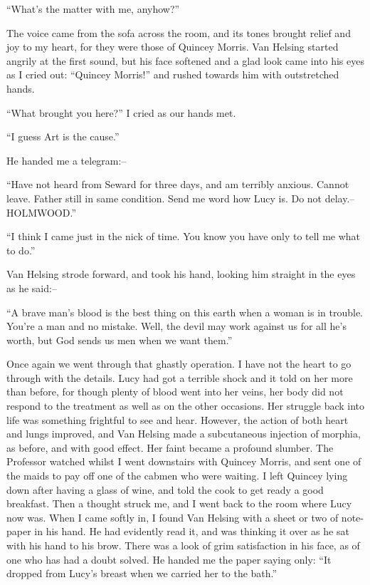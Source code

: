 \documentclass[12pt,openright]{book}
\begin{document}
“What’s the matter with me, anyhow?”

The voice came from the sofa across the room, and its tones brought relief and joy to my heart, for they were those of Quincey Morris. Van Helsing started angrily at the first sound, but his face softened and a glad look came into his eyes as I cried out: “Quincey Morris!” and rushed towards him with outstretched hands.

“What brought you here?” I cried as our hands met.

“I guess Art is the cause.”

He handed me a telegram:–

“Have not heard from Seward for three days, and am terribly anxious. Cannot leave. Father still in same condition. Send me word how Lucy is. Do not delay.–HOLMWOOD.”

“I think I came just in the nick of time. You know you have only to tell me what to do.”

Van Helsing strode forward, and took his hand, looking him straight in the eyes as he said:–

“A brave man’s blood is the best thing on this earth when a woman is in trouble. You’re a man and no mistake. Well, the devil may work against us for all he’s worth, but God sends us men when we want them.”

Once again we went through that ghastly operation. I have not the heart to go through with the details. Lucy had got a terrible shock and it told on her more than before, for though plenty of blood went into her veins, her body did not respond to the treatment as well as on the other occasions. Her struggle back into life was something frightful to see and hear. However, the action of both heart and lungs improved, and Van Helsing made a subcutaneous injection of morphia, as before, and with good effect. Her faint became a profound slumber. The Professor watched whilst I went downstairs with Quincey Morris, and sent one of the maids to pay off one of the cabmen who were waiting. I left Quincey lying down after having a glass of wine, and told the cook to get ready a good breakfast. Then a thought struck me, and I went back to the room where Lucy now was. When I came softly in, I found Van Helsing with a sheet or two of note-paper in his hand. He had evidently read it, and was thinking it over as he sat with his hand to his brow. There was a look of grim satisfaction in his face, as of one who has had a doubt solved. He handed me the paper saying only: “It dropped from Lucy’s breast when we carried her to the bath.”
\end{document}
